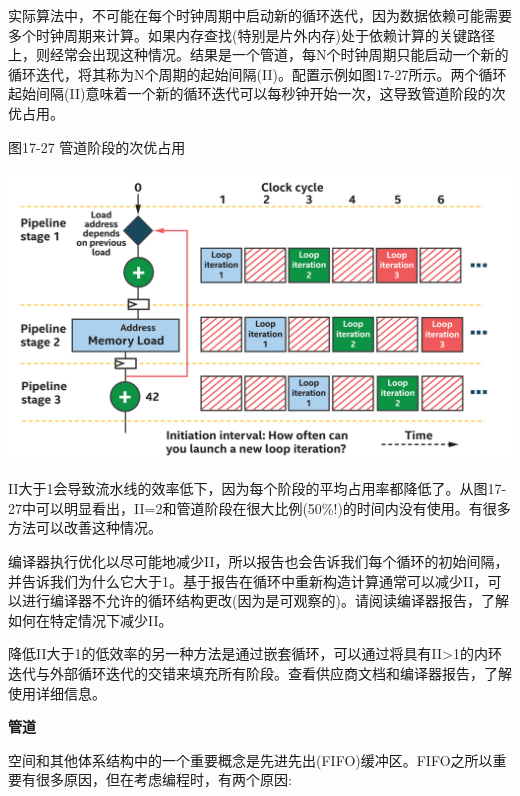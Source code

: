 实际算法中，不可能在每个时钟周期中启动新的循环迭代，因为数据依赖可能需要多个时钟周期来计算。如果内存查找(特别是片外内存)处于依赖计算的关键路径上，则经常会出现这种情况。结果是一个管道，每N个时钟周期只能启动一个新的循环迭代，将其称为N个周期的起始间隔(II)。配置示例如图17-27所示。两个循环起始间隔(II)意味着一个新的循环迭代可以每秒钟开始一次，这导致管道阶段的次优占用。\par

\hspace*{\fill} \par %
图17-27 管道阶段的次优占用
\begin{center}
	\includegraphics[width=1.0\textwidth]{content/chapter-17/images/22}
\end{center}

II大于1会导致流水线的效率低下，因为每个阶段的平均占用率都降低了。从图17-27中可以明显看出，II=2和管道阶段在很大比例(50\%!)的时间内没有使用。有很多方法可以改善这种情况。\par

编译器执行优化以尽可能地减少II，所以报告也会告诉我们每个循环的初始间隔，并告诉我们为什么它大于1。基于报告在循环中重新构造计算通常可以减少II，可以进行编译器不允许的循环结构更改(因为是可观察的)。请阅读编译器报告，了解如何在特定情况下减少II。\par

降低II大于1的低效率的另一种方法是通过嵌套循环，可以通过将具有II>1的内环迭代与外部循环迭代的交错来填充所有阶段。查看供应商文档和编译器报告，了解使用详细信息。\par

\hspace*{\fill} \par %
\textbf{管道}

空间和其他体系结构中的一个重要概念是先进先出(FIFO)缓冲区。FIFO之所以重要有很多原因，但在考虑编程时，有两个原因:\par

